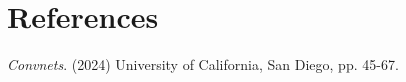 \section*{References}

\medskip


{
	\small


	\begin{enumerate}[label={[\arabic*]}]
		\item \textit{Convnets}. (2024) University of California, San Diego, pp. 45-67.
	\end{enumerate}
}
